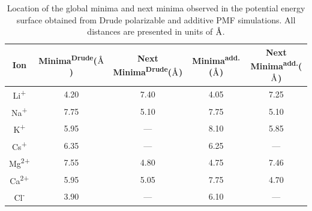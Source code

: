 \begin{table}
    \centering
    \small
    \caption[Location of the global minima and next minima observed in the potential energy surface obtained from Drude polarizable and additive PMF simulations]{Location of the global minima and next minima observed in the potential energy surface obtained from Drude polarizable and additive PMF simulations. All distances are presented in units of $\text{\normalfont\AA}$.}
    \begin{tabular}{ccccc}
    \toprule
    Ion         &   Minima\textsuperscript{Drude}($\text{\normalfont\AA}$)    & Next Minima\textsuperscript{Drude}($\text{\normalfont\AA}$)   &   Minima\textsuperscript{add.}($\text{\normalfont\AA}$)  &   Next Minima\textsuperscript{add.}($\text{\normalfont\AA}$)  \\ \midrule
    Li\textsuperscript{+}                           & 4.20                       & 7.40                     & 4.05                   & 7.25                 \\
    Na\textsuperscript{+}                           & 7.75                       & 5.10                     & 7.75                   & 5.10                 \\
    K\textsuperscript{+}                            & 5.95                       & —                        & 8.10                   & 5.85                 \\
    Cs\textsuperscript{+}                           & 6.35                       & —                        & 6.25                   & —                    \\
    Mg\textsuperscript{2+}                          & 7.55                       & 4.80                     & 4.75                   & 7.46                 \\
    Ca\textsuperscript{2+}                          & 5.95                       & 5.05                     & 7.75                   & 4.70                 \\
    Cl\textsuperscript{-}                           & 3.90                       & —                        & 6.10                   & —                    \\ \bottomrule
    \end{tabular}
    \end{table}

